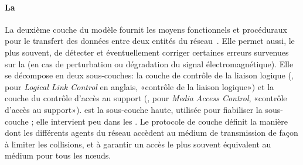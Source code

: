             \paragraph{La }\label{st:ssec:mac}
La deuxième couche du modèle fournit les moyens fonctionnels et procéduraux pour le transfert des données entre deux entités du réseau~\cite{TW10}.
Elle permet aussi, le plus souvent, de détecter et éventuellement corriger certaines erreurs survenues sur la  (en cas de perturbation ou dégradation du signal électromagnétique).
Elle se décompose en deux sous-couches: la couche de contrôle de la liaison logique (\llc, pour \textit{Logical Link Control} en anglais, «contrôle de la liaison logique») et la couche du contrôle d'accès au support (\mac, pour \textit{Media Access Control}, «contrôle d'accès au support»).
\llc est la sous-couche haute, utilisée pour fiabiliser la sous-couche \mac; elle intervient peu dans les \rcs.
Le protocole de couche \mac définit la manière dont les différents agents du réseau accèdent au médium de transmission de façon à limiter les collisions, et à garantir un accès le plus souvent équivalent au médium pour tous les nœuds.
